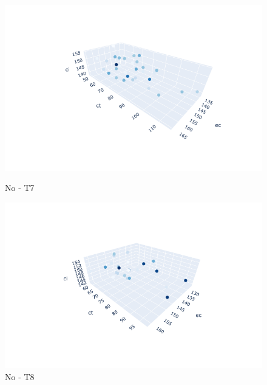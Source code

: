 \documentclass{hust}
\begin{document}
\begin{itemize}
	\begin{figure}[H]
		\begin{minipage}{0.5\textwidth}
			\centering
			\includegraphics[width=1.2\linewidth]{images/no-dem7.png}
			\caption{No - T7}\label{fig:nsga-ii-no-dem7}
		\end{minipage}\hfill
		\begin{minipage}{0.5\textwidth}
			\centering
			\includegraphics[width=1.2\linewidth]{images/no-dem8.png}
			\caption{No - T8}\label{fig:nsga-ii-no-dem8}
		\end{minipage}
	\end{figure}
	

\end{itemize}
\end{document}
